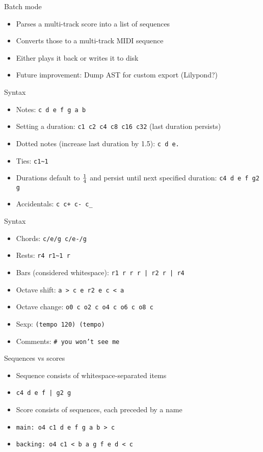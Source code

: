 \documentclass[presentation]{beamer}
\begin{document}
\begin{frame}[label=sec-3-4]{Batch mode}
\begin{itemize}
\item Parses a multi-track score into a list of sequences
\item Converts those to a multi-track MIDI sequence
\item Either plays it back or writes it to disk
\item Future improvement: Dump AST for custom export (Lilypond?)
\end{itemize}
\end{frame}

\begin{frame}[fragile,label=sec-3-5]{Syntax}
 \begin{itemize}
\item Notes: \texttt{c d e f g a b}
\item Setting a duration: \texttt{c1 c2 c4 c8 c16 c32} (last duration persists)
\item Dotted notes (increase last duration by 1.5): \texttt{c d e.}
\item Ties: \texttt{c1\textasciitilde{}1}
\item Durations default to $1\over{4}$ and persist until next specified
duration: \texttt{c4 d e f g2 g}
\item Accidentals: \texttt{c c+ c- c\_}
\end{itemize}
\end{frame}

\begin{frame}[fragile,label=sec-3-6]{Syntax}
 \begin{itemize}
\item Chords: \texttt{c/e/g c/e-/g}
\item Rests: \texttt{r4 r1\textasciitilde{}1 r}
\item Bars (considered whitespace): \texttt{r1 r r r | r2 r | r4}
\item Octave shift: \texttt{a > c e r2 e c < a}
\item Octave change: \texttt{o0 c o2 c o4 c o6 c o8 c}
\item Sexp: \texttt{(tempo 120) (tempo)}
\item Comments: \texttt{\# you won't see me}
\end{itemize}
\end{frame}

\begin{frame}[fragile,label=sec-3-7]{Sequences vs scores}
 \begin{itemize}
\item Sequence consists of whitespace-separated items
\item \texttt{c4 d e f | g2 g}
\item Score consists of sequences, each preceded by a name
\item \texttt{main: o4 c1 d e f g a b > c}
\item \texttt{backing: o4 c1 < b a g f e d < c}
\end{itemize}
\end{frame}
\end{document}
